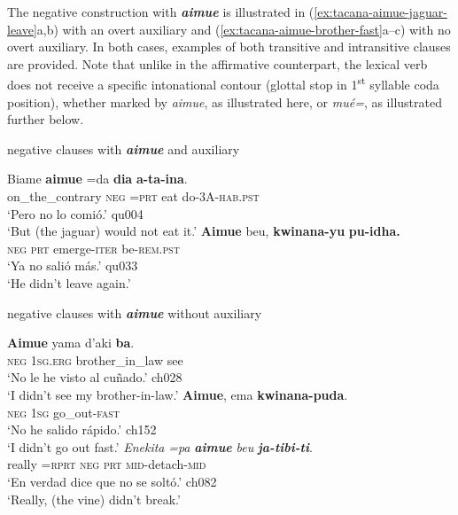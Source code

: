 \documentclass[output=paper]{langsci/langscibook}
\begin{document}
The negative construction with \textbf{\textit{aimue}} is illustrated in
(\ref{ex:tacana-aimue-jaguar-leave}a,b) with an overt auxiliary and
(\ref{ex:tacana-aimue-brother-fast}a--c) with no overt auxiliary. In both cases, examples of both transitive and intransitive clauses are provided. Note that unlike in the affirmative counterpart, the lexical verb does not receive a specific intonational contour (glottal stop in 1\textsuperscript{st} syllable coda position), whether marked by \textit{aimue}, as illustrated here, or \textit{mué=}, as illustrated further below.

\begin{exe}\ex
\label{ex:tacana-aimue-jaguar-leave}  negative clauses with \textbf{\textit{aimue}} and auxiliary
\begin{xlist}
\ex\label{ex:tacana-aimue-jaguar}
\gll  Biame  \textbf{aimue}  =da \textbf{dia}
\textbf{a-ta-ina}.\\
    on\_the\_contrary  \textsc{neg}  \textsc{=prt}  eat
    do\textsc{-3A-hab.pst}\\
\glt `Pero no lo comió.' qu004\\
`But (the jaguar) would not eat it.'
\ex\label{ex:tacana-aimue-leave}
\gll  \textbf{Aimue}  beu, \textbf{kwinana-yu} \textbf{pu-idha.}\\
    \textsc{neg}  \textsc{prt}  emerge-\textsc{iter}  be\textsc{-rem.pst}\\
\glt `Ya no salió más.' qu033\\
`He didn't leave again.'
\end{xlist}
\ex
\label{ex:tacana-aimue-brother-fast}  negative clauses with \textbf{\textit{aimue}} without auxiliary
\begin{xlist}
\ex\label{ex:tacana-aimue-brother}
\gll  \textbf{Aimue} yama d'aki \textbf{ba}.\\
    \textsc{neg}  \textsc{1sg.erg}  brother\_in\_law  see\\
\glt `No le he visto al cuñado.' ch028\\
`I didn't see my brother-in-law.'
\ex\label{ex:tacana-aimue-fast}
\gll  \textbf{Aimue}, ema \textbf{kwinana-puda}.\\
    \textsc{neg}  \textsc{1sg}  go\_out-\textsc{fast}\\
\glt `No he salido rápido.' ch152\\
`I didn't go out fast.'
\ex\label{ex:tacana-aimue-liana}
\gll  \textit{Enekita}  \textit{=pa}  \textbf{\textit{aimue}}
\textit{beu} \textbf{\textit{ja-tibi-ti}}.\\
really  =\textsc{rprt}  \textsc{neg}  \textsc{prt}
\textsc{mid-}detach-\textsc{mid}\\
\glt `En verdad dice que no se soltó.' ch082\\
`Really, (the vine) didn't break.'
\end{xlist}\end{exe}
\end{document}
